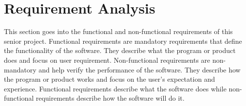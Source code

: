 \documentclass[12pt,letterpaper,oneside,reqno]{book}
\theoremstyle{plain}
\theoremstyle{definition}
\theoremstyle{plain}
\theoremstyle{remark}
\theoremstyle{plain}
\theoremstyle{definition}
\theoremstyle{plain}
\begin{document}
\chapter{Requirement Analysis}
This section goes into the functional and non-functional requirements of this senior project. Functional requirements are mandatory requirements that define the functionality of the software. They describe what the program or product does and focus on user requirement. Non-functional requirements are non-mandatory and help verify the performance of the software. They describe how the program or product works and focus on the user's expectation and experience. Functional requirements describe what the software does while non-functional requirements describe how the software will do it.
\end{document}
